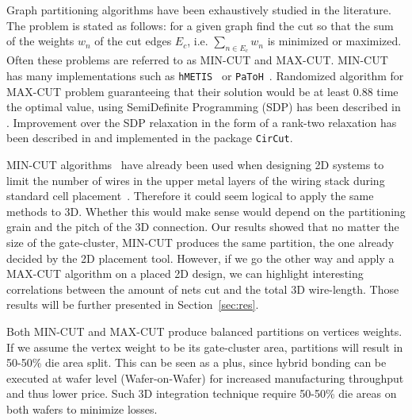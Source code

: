 \documentclass[conference]{IEEEtran}
\begin{document}
Graph partitioning algorithms have been exhaustively studied in the literature. The problem is stated as follows: for a given graph find the cut so that the sum of the weights $w_n$ of the cut edges $E_c$, i.e. $\sum_{n \in E_c} w_{n}$ is minimized or maximized. Often these problems are referred to as MIN-CUT and MAX-CUT. MIN-CUT has many implementations such as \texttt{hMETIS}~\cite{Karypis1999} or \texttt{PaToH}~\cite{Aykanat2011}. Randomized algorithm for MAX-CUT problem guaranteeing that their solution would be at least 0.88 time the optimal value, using SemiDefinite Programming (SDP) has been described in \cite{Goemans1995}. Improvement over the SDP relaxation in the form of a rank-two relaxation has been described in \cite{Burer2000} and implemented in the package \texttt{CirCut}.

MIN-CUT algorithms~\cite{Karypis1999,Aykanat2011} have already been used when designing 2D systems to limit the number of wires in the upper metal layers of the wiring stack during standard cell placement~\cite{KahngAndrewB.Lienig2011}. Therefore it could seem logical to apply the same methods to 3D. Whether this would make sense would depend on the partitioning grain and the pitch of the 3D connection. Our results showed that no matter the size of the gate-cluster, MIN-CUT produces the same partition, the one already decided by the 2D placement tool. However, if we go the other way and apply a MAX-CUT algorithm on a placed 2D design, we can highlight interesting correlations between the amount of nets cut and the total 3D wire-length. Those results will be further presented in Section~\ref{sec:res}.

Both MIN-CUT and MAX-CUT produce balanced partitions on vertices weights. If we assume the vertex weight to be its gate-cluster area, partitions will result in 50-50\% die area split. This can be seen as a plus, since hybrid bonding can be executed at wafer level (Wafer-on-Wafer) for increased manufacturing throughput and thus lower price. Such 3D integration technique require 50-50\% die areas on both wafers to minimize losses.
\end{document}
